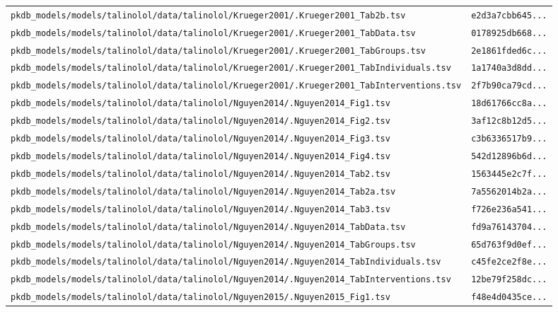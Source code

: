 \begin{longtable}{ll}
\texttt{pkdb\_models/models/talinolol/data/talinolol/Krueger2001/.Krueger2001\_Tab2b.tsv} & \texttt{e2d3a7cbb645...} \\
\texttt{pkdb\_models/models/talinolol/data/talinolol/Krueger2001/.Krueger2001\_TabData.tsv} & \texttt{0178925db668...} \\
\texttt{pkdb\_models/models/talinolol/data/talinolol/Krueger2001/.Krueger2001\_TabGroups.tsv} & \texttt{2e1861fded6c...} \\
\texttt{pkdb\_models/models/talinolol/data/talinolol/Krueger2001/.Krueger2001\_TabIndividuals.tsv} & \texttt{1a1740a3d8dd...} \\
\texttt{pkdb\_models/models/talinolol/data/talinolol/Krueger2001/.Krueger2001\_TabInterventions.tsv} & \texttt{2f7b90ca79cd...} \\
\texttt{pkdb\_models/models/talinolol/data/talinolol/Nguyen2014/.Nguyen2014\_Fig1.tsv} & \texttt{18d61766cc8a...} \\
\texttt{pkdb\_models/models/talinolol/data/talinolol/Nguyen2014/.Nguyen2014\_Fig2.tsv} & \texttt{3af12c8b12d5...} \\
\texttt{pkdb\_models/models/talinolol/data/talinolol/Nguyen2014/.Nguyen2014\_Fig3.tsv} & \texttt{c3b6336517b9...} \\
\texttt{pkdb\_models/models/talinolol/data/talinolol/Nguyen2014/.Nguyen2014\_Fig4.tsv} & \texttt{542d12896b6d...} \\
\texttt{pkdb\_models/models/talinolol/data/talinolol/Nguyen2014/.Nguyen2014\_Tab2.tsv} & \texttt{1563445e2c7f...} \\
\texttt{pkdb\_models/models/talinolol/data/talinolol/Nguyen2014/.Nguyen2014\_Tab2a.tsv} & \texttt{7a5562014b2a...} \\
\texttt{pkdb\_models/models/talinolol/data/talinolol/Nguyen2014/.Nguyen2014\_Tab3.tsv} & \texttt{f726e236a541...} \\
\texttt{pkdb\_models/models/talinolol/data/talinolol/Nguyen2014/.Nguyen2014\_TabData.tsv} & \texttt{fd9a76143704...} \\
\texttt{pkdb\_models/models/talinolol/data/talinolol/Nguyen2014/.Nguyen2014\_TabGroups.tsv} & \texttt{65d763f9d0ef...} \\
\texttt{pkdb\_models/models/talinolol/data/talinolol/Nguyen2014/.Nguyen2014\_TabIndividuals.tsv} & \texttt{c45fe2ce2f8e...} \\
\texttt{pkdb\_models/models/talinolol/data/talinolol/Nguyen2014/.Nguyen2014\_TabInterventions.tsv} & \texttt{12be79f258dc...} \\
\texttt{pkdb\_models/models/talinolol/data/talinolol/Nguyen2015/.Nguyen2015\_Fig1.tsv} & \texttt{f48e4d0435ce...} \\

\end{longtable}

